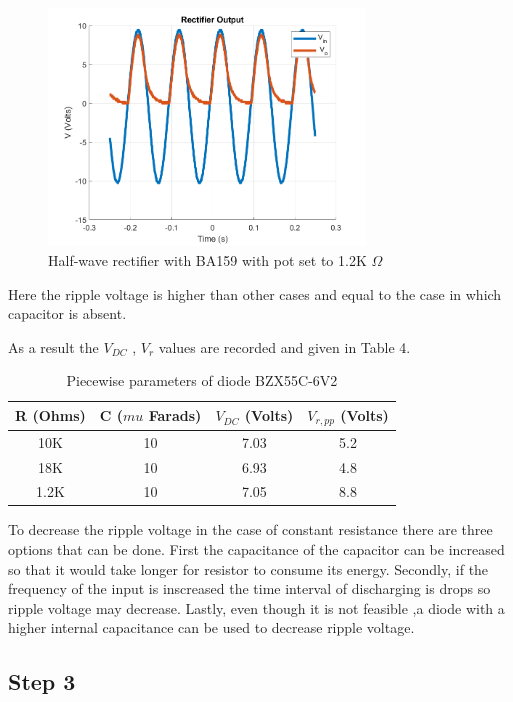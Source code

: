 \documentclass[letterpaper,12pt]{article}
\begin{document}
\begin{figure}[H]
    \centering
    \includegraphics[width = 0.75\textwidth]{2_b_POT_1_2K.png}
    \caption{Half-wave rectifier with BA159 with pot set to 1.2K \(\Omega\)}
\end{figure} 
Here the ripple voltage is higher than other cases and equal to the case in which capacitor is absent.

As a result the \(V_{DC}\) , \( V_r \) values are recorded  and given in Table 4.

\begin{table}[H]
    \centering
    \caption{Piecewise parameters of diode BZX55C-6V2}
    \vspace{2mm}
    \begin{tabular}{||c | c | c | c||}
        \hline
    R (Ohms)& C (\(mu\) Farads) &\(V_{DC}\) (Volts) & \(V_{r , pp}\) (Volts) \\
    \hline
    10K & 10 & 7.03 & 5.2 \\
    \hline
    18K & 10 & 6.93 & 4.8 \\
    \hline
    1.2K & 10 & 7.05 & 8.8 \\
    \hline
    \end{tabular}
\end{table}
To decrease the ripple voltage in the case of constant resistance there are three options that can be done. First the capacitance of the capacitor can be increased so that it would take longer for resistor to consume its energy. Secondly, if the frequency of the input is inscreased the time interval of discharging is drops so ripple voltage may decrease. Lastly, even though it is not feasible ,a diode with a higher internal capacitance can be used to decrease ripple voltage.

\subsection{Step 3}
\end{document}
